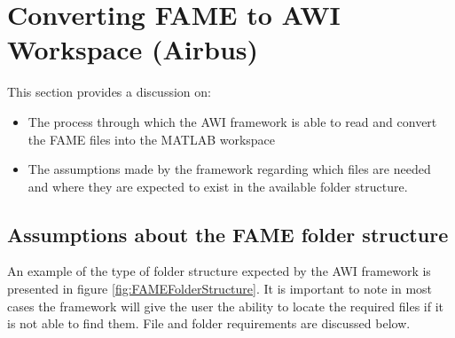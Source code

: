 \section*{Converting FAME to AWI Workspace (Airbus)}
This section provides a discussion on: 
\begin{itemize}
\item The process through which the AWI framework is able to read and convert the FAME files into the MATLAB workspace
\item The assumptions made by the framework regarding which files are needed and where they are expected to exist in the available folder structure.
\end{itemize}
\subsection*{Assumptions about the FAME folder structure}

An example of the type of folder structure expected by the AWI framework is presented in figure \ref{fig:FAMEFolderStructure}. It is important to note in most cases the framework will give the user the ability to locate the required files if it is not able to find them. File and folder requirements are discussed below.

